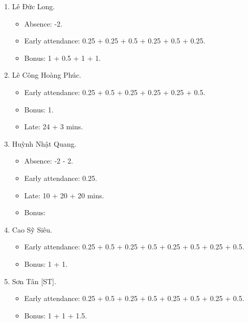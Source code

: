 \documentclass{article}
\begin{document}
\begin{enumerate}
\begin{itemize}
	\end{itemize}
	\item {\sc Lê Đức Long.}
	\begin{itemize}
		\item Absence: -2.
		\item Early attendance: 0.25 + 0.25 + 0.5 + 0.25 + 0.5 + 0.25.
		\item Bonus: 1 + 0.5 + 1 + 1.
	\end{itemize}
	\item {\sc Lê Công Hoàng Phúc.}
	\begin{itemize}
		\item Early attendance: 0.25 + 0.5 + 0.25 + 0.25 + 0.25 + 0.5.
		\item Bonus: 1. 
		\item Late: 24 + 3 mins.
	\end{itemize}
	\item {\sc Huỳnh Nhật Quang.}
	\begin{itemize}
		\item Absence: -2 - 2.
		\item Early attendance: 0.25.
		\item Late: 10 + 20 + 20 mins.
		\item Bonus: 
	\end{itemize}
	\item {\sc Cao Sỹ Siêu.}
	\begin{itemize}
		\item Early attendance: 0.25 + 0.5 + 0.25 + 0.5 + 0.25 + 0.5 + 0.25 + 0.5.
		\item Bonus: 1 + 1.
	\end{itemize}
	\item {\sc Sơn Tân [ST].}
	\begin{itemize}
		\item Early attendance: 0.25 + 0.5 + 0.25 + 0.5 + 0.25 + 0.5 + 0.25 + 0.5.
		\item Bonus: 1 + 1 + 1.5.
		

\end{itemize}
\end{enumerate}
\end{document}
